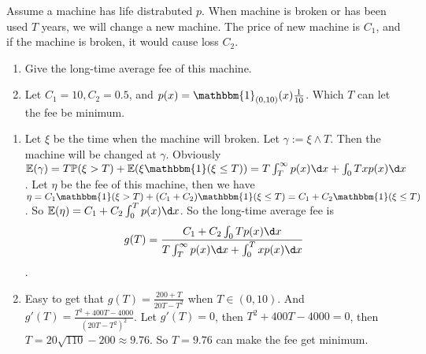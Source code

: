 \documentclass{ctexart}
\begin{document}
\begin{problem}\label{pro:3}
  Assume a machine has life distrabuted \(p\). When machine is broken or has been used \(T\) years, we will change a new machine.
  The price of new machine is \(C_1\), and if the machine is broken, it would cause loss \(C_2\).
  \begin{enumerate}
    \item Give the long-time average fee of this machine.
    \item Let \(C_1=10,C_2=0.5\), and \(p(x)=\mathbbm{1}_{(0,10)}(x) \frac{1}{10}\).
      Which \(T\) can let the fee be minimum.
  \end{enumerate}
\end{problem}
\begin{solution}
  \begin{enumerate}
    \item Let \(\xi\) be the time when the machine will broken. Let \(\gamma:=\xi \wedge T\).
      Then the machine will be changed at \(\gamma\).
      Obviously \(\mathbb{E}(\gamma)=T \mathbb{P}(\xi>T)+\mathbb{E}(\xi \mathbbm{1}(\xi \leq T))=T \int_{T}^{\infty}p(x) \d x + \int_{0}T xp(x) \d x\).
      Let \(\eta\) be the fee of this machine, then we have \(\eta=C_1\mathbbm{1}(\xi>T)+(C_1+C_2)\mathbbm{1}(\xi \leq T)=C_1+C_2 \mathbbm{1}(\xi \leq T)\).
      So \(\mathbb{E}(\eta)=C_1+C_2 \int_{0}^{T}p(x) \d x\).
      So the long-time average fee is
      \[
        g(T)=\frac{C_1+C_2 \int_{0}T p(x) \d x}{T \int_{T}^{\infty}p(x) \d x + \int_{0}^{T}x p(x) \d x}
      \].
    \item Easy to get that \(g(T)=\frac{200+T}{20T-T^2}\) when \(T \in (0,10)\).
      And \(g'(T)=\frac{T^2 + 400T - 4000}{(20T-T^2)^2}\).
      Let \(g'(T)=0\), then \(T^2+400T-4000=0\), then \(T=20 \sqrt{110}-200 \approx 9.76\).
      So \(T=9.76\) can make the fee get minimum.
  \end{enumerate}
\end{solution}
\end{document}
